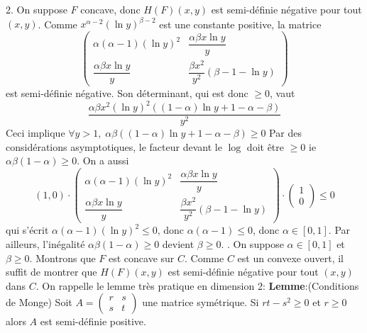 \documentclass{fancybook}
\begin{document}
2. On suppose $F$ concave, donc $H(F)(x,y)$ est semi-définie négative pour tout $(x,y)$. Comme $x^{\alpha -2}(\ln y)^{\beta-2}$ est une constante positive, la matrice $$\begin{pmatrix}
\alpha(\alpha -1)(\ln y)^2 & \dfrac{\alpha \beta x\ln y}{y} \\
\dfrac{\alpha \beta x\ln y}{y} & \dfrac{\beta x^2}{y^2}(\beta -1 -\ln y)
\end{pmatrix}$$
est semi-définie négative.\newline
Son déterminant, qui est donc $\geq 0$, vaut $$\dfrac{\alpha \beta x^{2 } (\ln y)^2 ((1-\alpha)\ln y +1 -\alpha-\beta)}{y^2}$$
Ceci implique $\forall y>1,\; \alpha \beta ((1-\alpha)\ln y +1 -\alpha-\beta) \geq 0 $\newline
Par des considérations asymptotiques, le facteur devant le $\log$ doit être $\geq 0$ ie  $\alpha \beta (1-\alpha) \geq 0$. \newline 
\newline
On a aussi $$(1,0)\cdot \begin{pmatrix}
\alpha(\alpha -1)(\ln y)^2 & \dfrac{\alpha \beta x\ln y}{y} \\
\dfrac{\alpha \beta x\ln y}{y} & \dfrac{\beta x^2}{y^2}(\beta -1 -\ln y)
\end{pmatrix} \cdot\begin{pmatrix}
1\\ 0
\end{pmatrix}\leq 0$$
qui s'écrit $\alpha(\alpha-1)(\ln y)^2\leq 0$, donc $\alpha(\alpha-1)\leq 0$, donc $\alpha \in [0,1]$.\newline
Par ailleurs, l'inégalité $\alpha \beta (1-\alpha) \geq 0$ devient $\beta \geq 0$. \newline
{}. On suppose $\alpha \in [0,1]$ et $\beta \geq 0$. Montrons que $F$ est concave sur $C$. Comme $C$ est un convexe ouvert, il suffit de montrer que $H(F)(x,y)$ est semi-définie négative pour tout $(x,y)$ dans $C$.\newline 
On rappelle le lemme très pratique en dimension 2:\newline
\textbf{Lemme}:(Conditions de Monge) \newline 
Soit $A=\begin{pmatrix}
r & s\\
s & t
\end{pmatrix}$ une matrice symétrique.\newline
Si $rt-s^2\geq 0$ et $r\geq 0$ alors $A$ est semi-définie positive.\newline
\end{document}
